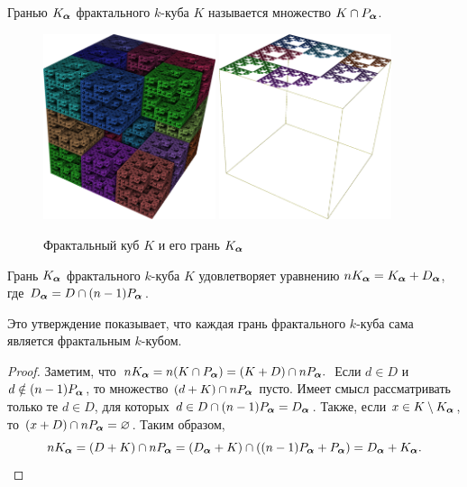 \begin{definition}\label{def:K_alpha}
Гранью $K_{\bm{\alpha}}$ фрактального $k$-куба $K$ называется множество $K\cap P_{\bm{\alpha}}$.
\end{definition}

\begin{figure}[h!]
\centering
\includegraphics[width=0.45\textwidth]{images/presentation/qK.png}
 \hfill
 \includegraphics[width=0.45\textwidth]{images/presentation/qK_a.png}
  \caption{Фрактальный куб $K$ и его грань $K_{\bm{\alpha}}$}
 \label{fig:qK_a}
\end{figure}

\begin{proposition}\label{prop:Ka}
Грань $K_{\bm{\alpha}}$ фрактального $k$-куба $K$ удовлетворяет уравнению $n K_{\bm{\alpha}}=K_{\bm{\alpha}}+D_{\bm{\alpha}}$, где $D_{\bm{\alpha}}=D\cap(n-1)P_{\bm{\alpha}}$.
\end{proposition}

Это утверждение показывает, что каждая грань фрактального $k$-куба сама является фрактальным $k$-кубом.

\begin{proof}
Заметим, что $n K_{\bm{\alpha}}=n(K\cap P_{\bm{\alpha}})=(K+D)\cap nP_{\bm{\alpha}}.$ 
Если $d\in D$ и   $d\notin(n-1)P_{\bm{\alpha}}$, то множество $(d+K)\cap nP_{\bm{\alpha}}$ пусто.
Имеет смысл рассматривать только те $d\in D$, для которых $d\in D\cap (n-1)P_{\bm{\alpha}}=D_{\bm{\alpha}}$. Также, если $x\in K\setminus K_{\bm{\alpha}}$, то $(x+D)\cap nP_{\bm{\alpha}}=\varnothing$.  
Таким образом, $$n K_{\bm{\alpha}}=(D+K)\cap n P_{\bm{\alpha}}=(D_{\bm{\alpha}}+K)\cap ((n-1)P_{\bm{\alpha}}+P_{\bm{\alpha}})=D_{\bm{\alpha}}+K_{\bm{\alpha}}.$$
\end{proof}

